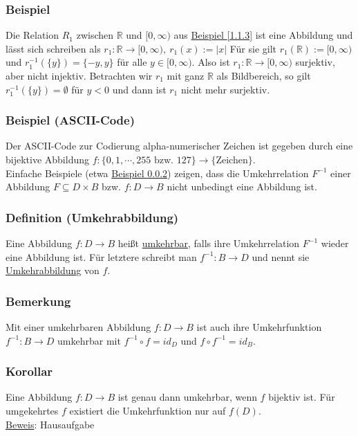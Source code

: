 \subsubsection{Beispiel}
Die Relation $R_1$ zwischen $\mathbb{R}$ und $[0,\infty )$ aus \hyperref[1.1.3]{Beispiel \ref*{1.1.3}} ist eine Abbildung und lässt sich schreiben als $r_1:\mathbb{R}\rightarrow [0,\infty ),\ r_1(x):=\left|x\right|$
Für sie gilt $r_1(\mathbb{R}):=[0,\infty )$ und $r_1^{-1}(\{y\})=\{-y,y\}$ für alle $y\in [0,\infty )$.  Also ist $r_1:\mathbb{R}\rightarrow [0,\infty )$ surjektiv, aber nicht injektiv.  Betrachten wir $r_1$ mit ganz $\mathbb{R}$ als Bildbereich, so gilt $r_1^{-1}(\{y\})=\emptyset$ für $y<0$ und dann ist $r_1$ nicht mehr surjektiv.
\subsubsection{Beispiel (ASCII-Code)}
\label{ascii}
Der ASCII-Code zur Codierung alpha-numerischer Zeichen ist gegeben durch eine bijektive Abbildung $f:\{0,1,\cdots ,255\text{ bzw. $127$}\}\rightarrow \{$Zeichen$\}$.\\
Einfache Beispiele (etwa \hyperref[ascii]{Beispiel \ref*{ascii}}) zeigen, dass die Umkehrrelation $F^{-1}$ einer Abbildung $F\subseteq D\times B$ bzw. $f:D\rightarrow B$ nicht unbedingt eine Abbildung ist.
\subsubsection{Definition (Umkehrabbildung)}
Eine Abbildung $f:D\rightarrow B$ heißt \underline{umkehrbar}, falls ihre Umkehrrelation $F^{-1}$ wieder eine Abbildung ist.  Für letztere schreibt man $f^{-1}:B\rightarrow D$ und nennt sie \underline{Umkehrabbildung} von $f$.
\subsubsection{Bemerkung}
Mit einer umkehrbaren Abbildung $f:D\rightarrow B$ ist auch ihre Umkehrfunktion $f^{-1}:B\rightarrow D$ umkehrbar mit $f^{-1}\circ f = id_D$ und $f\circ f^{-1}=id_B$.
\subsubsection{Korollar}
Eine Abbildung $f:D\rightarrow B$ ist genau dann umkehrbar, wenn $f$ bijektiv ist.  Für umgekehrtes $f$ existiert die Umkehrfunktion nur auf $f(D)$. \\
\underline{Beweis}: Hausaufgabe
